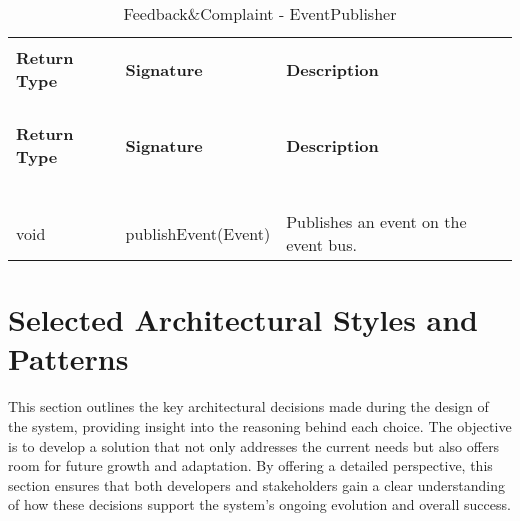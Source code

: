 \begin{longtable}{p{}p{}p{}}
    \caption{Feedback\&Complaint - EventPublisher}
    \vspace{0.5em}\\
    \hline
    \vspace{0.5em}\\
    \textbf{Return Type} & \textbf{Signature} & \textbf{Description} \\
    \vspace{0.5em}\\
    \hline
    \vspace{0.5em}\\
    \endfirsthead
    \vspace{0.5em}\\
    \hline
    \vspace{0.5em}\\
    \textbf{Return Type} & \textbf{Signature} & \textbf{Description} \\
    \vspace{0.5em}\\
    \hline
    \vspace{0.5em}\\
    \endhead
    
    \vspace{0.5em}\\
    \hline
    \vspace{0.5em}\\
    \endfoot
    
    \vspace{0.5em}\\
    \hline
    \vspace{0.5em}\\
    \endlastfoot
    
    void &
    publishEvent(Event) &
    Publishes an event on the event bus. \\

\end{longtable}

\section{Selected Architectural Styles and Patterns}

This section outlines the key architectural decisions made during the design of the system, providing insight into the reasoning behind each choice. The objective is to develop a solution that not only addresses the current needs but also offers room for future growth and adaptation. By offering a detailed perspective, this section ensures that both developers and stakeholders gain a clear understanding of how these decisions support the system’s ongoing evolution and overall success.

